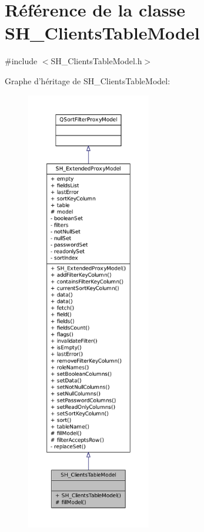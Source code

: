 \hypertarget{classSH__ClientsTableModel}{\section{Référence de la classe S\-H\-\_\-\-Clients\-Table\-Model}
\label{classSH__ClientsTableModel}
}


{\ttfamily \#include $<$S\-H\-\_\-\-Clients\-Table\-Model.\-h$>$}



Graphe d'héritage de S\-H\-\_\-\-Clients\-Table\-Model\-:
\nopagebreak
\begin{figure}[H]
\begin{center}
\leavevmode
\includegraphics[height=550pt]{classSH__ClientsTableModel__inherit__graph}
\end{center}
\end{figure}


